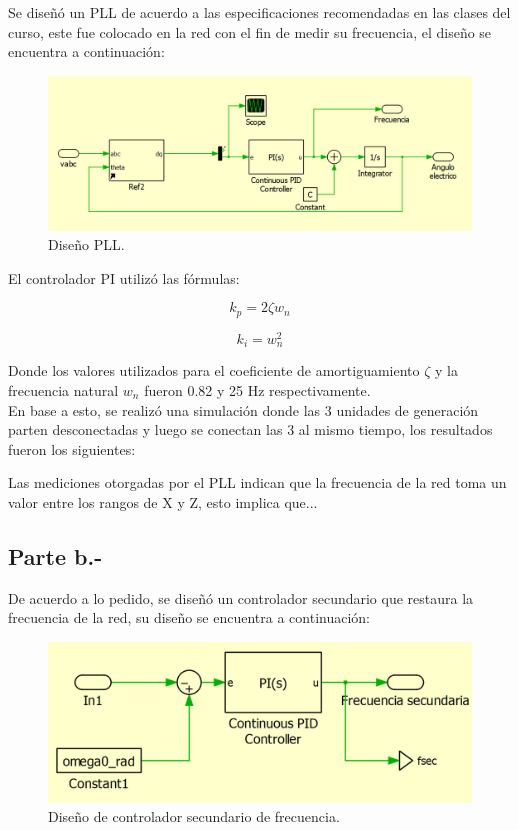 Se diseñó un PLL de acuerdo a las especificaciones recomendadas en las clases del curso, este fue colocado en la red con el fin de medir su frecuencia, el diseño se encuentra a continuación:

\begin{figure}
   \centering
   \includegraphics[width=0.5\linewidth]{Tarea 1/report/imagenes/p3a/pllred.png}
   \caption{Diseño PLL.}
   \label{diseñopll}
\end{figure}

El controlador PI utilizó las fórmulas:

\begin{equation}
    k_p = 2\zeta w_{n}
\end{equation}

\begin{equation}
    k_i = w_{n}^2
\end{equation}

Donde los valores utilizados para el coeficiente de amortiguamiento $\zeta$ y la frecuencia natural $w_{n}$ fueron 0.82 y 25 Hz respectivamente.\\

En base a esto, se realizó una simulación donde las 3 unidades de generación parten desconectadas y luego se conectan las 3 al mismo tiempo, los resultados fueron los siguientes:



Las mediciones otorgadas por el PLL indican que la frecuencia de la red toma un valor entre los rangos de X y Z, esto implica que...

\subsection{Parte b.-}

De acuerdo a lo pedido, se diseñó un controlador secundario que restaura la frecuencia de la red, su diseño se encuentra a continuación:

\begin{figure}
   \centering
   \includegraphics[width=0.5\linewidth]{Tarea 1/report/imagenes/p3b/secundario frecuencia.png}
   \caption{Diseño de controlador secundario de frecuencia.}
   \label{diseñosecfrecuencia}
\end{figure}

